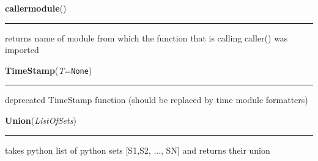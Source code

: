     \label{System:Utils:callermodule}

    \vspace{0.5ex}

\hspace{.8\funcindent}\begin{boxedminipage}{\funcwidth}

    \raggedright \textbf{callermodule}()

    \vspace{-1.5ex}

    \rule{\textwidth}{0.5\fboxrule}
\setlength{\parskip}{2ex}
    returns name of module from which the function that  is calling 
    caller() was imported

\setlength{\parskip}{1ex}
    \end{boxedminipage}

    \label{System:Utils:TimeStamp}

    \vspace{0.5ex}

\hspace{.8\funcindent}\begin{boxedminipage}{\funcwidth}

    \raggedright \textbf{TimeStamp}(\textit{T}={\tt None})

    \vspace{-1.5ex}

    \rule{\textwidth}{0.5\fboxrule}
\setlength{\parskip}{2ex}
    deprecated TimeStamp function (should be replaced by time module 
    formatters)

\setlength{\parskip}{1ex}
    \end{boxedminipage}

    \label{System:Utils:Union}

    \vspace{0.5ex}

\hspace{.8\funcindent}\begin{boxedminipage}{\funcwidth}

    \raggedright \textbf{Union}(\textit{ListOfSets})

    \vspace{-1.5ex}

    \rule{\textwidth}{0.5\fboxrule}
\setlength{\parskip}{2ex}
    takes python list of python sets [S1,S2, ..., SN] and returns their 
    union

\setlength{\parskip}{1ex}
    \end{boxedminipage}

